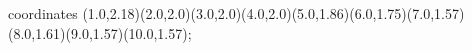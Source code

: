 					coordinates { (1.0,2.18)(2.0,2.0)(3.0,2.0)(4.0,2.0)(5.0,1.86)(6.0,1.75)(7.0,1.57)(8.0,1.61)(9.0,1.57)(10.0,1.57)};